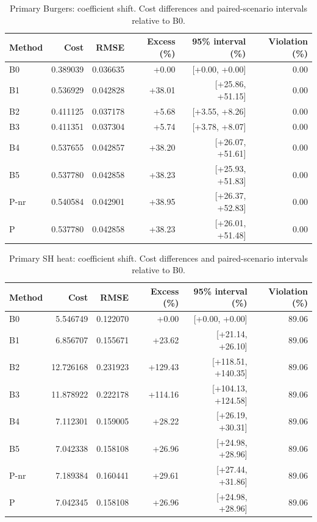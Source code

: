 \clearpage
\begin{table}[ht]
\centering\small
\caption{Primary Burgers: coefficient shift. Cost differences and paired-scenario intervals relative to B0.}
\begin{tabular}{@{}lrrrrr@{}}\toprule
Method & Cost & RMSE & Excess (\%) & 95\% interval (\%) & Violation (\%)\\\midrule
B0 & 0.389039 & 0.036635 & +0.00 & [+0.00, +0.00] & 0.00\\
B1 & 0.536929 & 0.042828 & +38.01 & [+25.86, +51.15] & 0.00\\
B2 & 0.411125 & 0.037178 & +5.68 & [+3.55, +8.26] & 0.00\\
B3 & 0.411351 & 0.037304 & +5.74 & [+3.78, +8.07] & 0.00\\
B4 & 0.537655 & 0.042857 & +38.20 & [+26.07, +51.61] & 0.00\\
B5 & 0.537780 & 0.042858 & +38.23 & [+25.93, +51.83] & 0.00\\
P-nr & 0.540584 & 0.042901 & +38.95 & [+26.37, +52.83] & 0.00\\
P & 0.537780 & 0.042858 & +38.23 & [+26.01, +51.48] & 0.00\\
\bottomrule\end{tabular}
\end{table}
\begin{table}[ht]
\centering\small
\caption{Primary SH heat: coefficient shift. Cost differences and paired-scenario intervals relative to B0.}
\begin{tabular}{@{}lrrrrr@{}}\toprule
Method & Cost & RMSE & Excess (\%) & 95\% interval (\%) & Violation (\%)\\\midrule
B0 & 5.546749 & 0.122070 & +0.00 & [+0.00, +0.00] & 89.06\\
B1 & 6.856707 & 0.155671 & +23.62 & [+21.14, +26.10] & 89.06\\
B2 & 12.726168 & 0.231923 & +129.43 & [+118.51, +140.35] & 89.06\\
B3 & 11.878922 & 0.222178 & +114.16 & [+104.13, +124.58] & 89.06\\
B4 & 7.112301 & 0.159005 & +28.22 & [+26.19, +30.31] & 89.06\\
B5 & 7.042338 & 0.158108 & +26.96 & [+24.98, +28.96] & 89.06\\
P-nr & 7.189384 & 0.160441 & +29.61 & [+27.44, +31.86] & 89.06\\
P & 7.042345 & 0.158108 & +26.96 & [+24.98, +28.96] & 89.06\\
\bottomrule\end{tabular}
\end{table}
